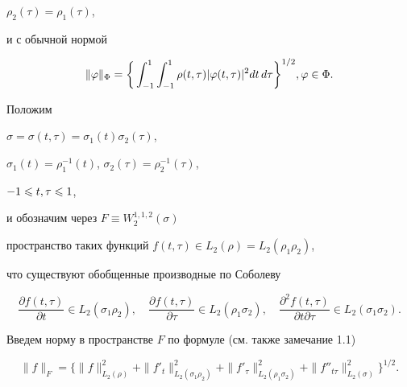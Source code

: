 $\rho_2(\tau)=\rho_1(\tau)$,


и с обычной нормой


$$


\|\vp\|_\Phi = \bigg\{\int_{-1}^{1}\int_{-1}^{1}


\rho(t,\tau)|\vp(t,\tau)|^2 dt\,d\tau\bigg\}^{1/2},


\vp \in \Phi.


$$


Положим


$\sigma = \sigma(t,\tau) = \sigma_1(t)\sigma_2(\tau)$,


$\sigma_1(t)=\rho^{-1}_1(t)$, $\sigma_2(\tau)=\rho^{-1}_2(\tau)$,


$-1\leqslant t,\tau \leqslant 1$,


и обозначим через $F\equiv W_2^{1,1,2}(\sigma)$


пространство таких функций $f(t,\tau)\in L_2(\rho) = L_2(\rho_1\rho_2)$, 


что существуют обобщенные производные по Соболеву


$$


\frac{\partial f(t,\tau)}{\partial t}\in L_2(\sigma_1\rho_2),\quad


\frac{\partial f(t,\tau)}{\partial \tau}\in L_2(\rho_1\sigma_2),\quad 


\frac{\partial^2 f(t,\tau)}{\partial t\partial\tau}\in L_2(\sigma_1\sigma_2).


$$


Введем норму в пространстве $F$ по формуле (см. также замечание 1.1)


$$


\|f\|_F = \big\{\|f\|^2_{L_2(\rho)} + \|f'_t\|^2_{L_2(\sigma_1\rho_2)} +


\|f'_\tau\|^2_{L_2(\rho_1\sigma_2)} +


\|f''_{t\tau}\|^2_{L_2(\sigma)}\big\}^{1/2}.


$$





